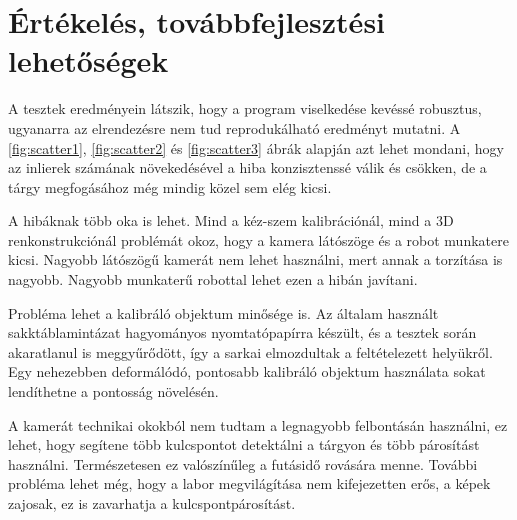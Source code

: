 \chapter{Értékelés, továbbfejlesztési lehetőségek}

A tesztek eredményein látszik, hogy a program viselkedése kevéssé robusztus, ugyanarra az elrendezésre nem tud reprodukálható eredményt mutatni. A \ref{fig:scatter1}, \ref{fig:scatter2} és \ref{fig:scatter3} ábrák alapján azt lehet mondani, hogy az inlierek számának növekedésével a hiba konzisztenssé válik és csökken, de a tárgy megfogásához még mindig közel sem elég kicsi.

A hibáknak több oka is lehet. Mind a kéz-szem kalibrációnál, mind a 3D renkonstrukciónál problémát okoz, hogy a kamera látószöge és a robot munkatere kicsi. Nagyobb látószögű kamerát nem lehet használni, mert annak a torzítása is nagyobb. Nagyobb munkaterű robottal lehet ezen a hibán javítani.

Probléma lehet a kalibráló objektum minősége is. Az általam használt sakktáblamintázat hagyományos nyomtatópapírra készült, és a tesztek során akaratlanul is meggyűrődött, így a sarkai elmozdultak a feltételezett helyükről. Egy nehezebben deformálódó, pontosabb kalibráló objektum használata sokat lendíthetne a pontosság növelésén.

A kamerát technikai okokból nem tudtam a legnagyobb felbontásán használni, ez lehet, hogy segítene több kulcspontot detektálni a tárgyon és több párosítást használni. Természetesen ez valószínűleg a futásidő rovására menne. További probléma lehet még, hogy a labor megvilágítása nem kifejezetten erős, a képek zajosak, ez is zavarhatja a kulcspontpárosítást.